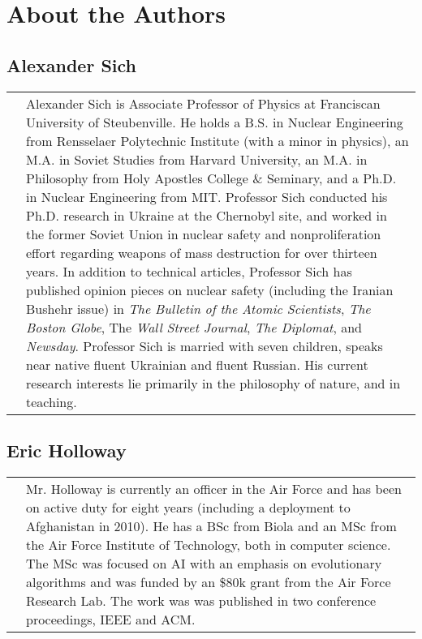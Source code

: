 \chapter{About the Authors}

\newenvironment{authorbio}[2]{
    \section*{#1}
    \begin{tabular}{ll}
    \begin{minipage}{1in}
        \ifstrequal{#2}{}{}  %
        {
            \texttt{[image: \#2]}
        }
    \end{minipage}
        &
    \begin{minipage}{\textwidth-1.2in}
    }{ %
    \end{minipage}
    \end{tabular}
}

\begin{authorbio}{Alexander Sich}{}
Alexander Sich is Associate Professor of Physics at Franciscan University of Steubenville. He holds a B.S. in Nuclear Engineering from Rensselaer Polytechnic Institute (with a minor in physics), an M.A. in Soviet Studies from Harvard University, an M.A. in Philosophy from Holy Apostles College \& Seminary, and a Ph.D. in Nuclear Engineering from MIT. Professor Sich conducted his Ph.D. research in Ukraine at the Chernobyl site, and worked in the former Soviet Union in nuclear safety and nonproliferation effort regarding weapons of mass destruction for over thirteen years. In addition to technical articles, Professor Sich has published opinion pieces on nuclear safety (including the Iranian Bushehr issue) in \emph{The Bulletin of the Atomic Scientists}, \emph{The Boston Globe}, The \emph{Wall Street Journal}, \emph{The Diplomat}, and \emph{Newsday}. Professor Sich is married with seven children, speaks near native fluent Ukrainian and fluent Russian. His current research interests lie primarily in the philosophy of nature, and in teaching.
\end{authorbio}

\begin{authorbio}{Eric Holloway}{holloway_photo.jpg}
Mr. Holloway is currently an officer in the Air Force and has been on
active duty for eight years (including a deployment to Afghanistan in
2010). He has a BSc from Biola and an MSc from the Air Force Institute
of Technology, both in computer science. The MSc was focused on AI
with an emphasis on evolutionary algorithms and was funded by an \$80k
grant from the Air Force Research Lab. The work was was published in
two conference proceedings, IEEE and ACM.
\end{authorbio}

